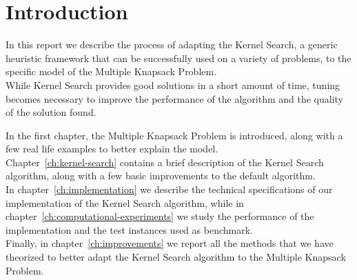 \chapter{Introduction}

In this report we describe the process of adapting the Kernel Search,
a generic heuristic framework that can be successfully used on a variety of
problems, to the specific model of the Multiple Knapsack Problem.\\
While Kernel Search provides good solutions in a short amount of time,
tuning becomes necessary to improve the performance of the algorithm
and the quality of the solution found.

In the first chapter, the Multiple Knapsack Problem is introduced,
along with a few real life examples to better explain the model.\\
Chapter~\ref{ch:kernel-search} contains a brief description of the Kernel Search algorithm,
along with a few basic improvements to the default algorithm.\\
In chapter~\ref{ch:implementation} we describe the technical
specifications of our implementation of the Kernel Search algorithm,
while in chapter~\ref{ch:computational-experiments} we study
the performance of the implementation and the test instances used as benchmark.\\
Finally, in chapter~\ref{ch:improvements} we report all
the methods that we have theorized to better adapt the Kernel Search
algorithm to the Multiple Knapsack Problem.
